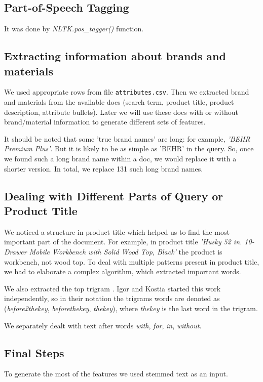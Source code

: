 \documentclass[12pt]{article}
\begin{document}
\subsection{Part-of-Speech Tagging}
It was done by \emph{NLTK.pos\_tagger()} function.

\subsection{Extracting information about brands and materials}
We used appropriate rows from file \texttt{attributes.csv}. Then we extracted brand and materials from the available docs (search term, product title, product description, attribute bullets). Later we will use these docs with or without brand/material information to generate different sets of features.

It should be noted that some 'true brand names' are long: for example, \emph{'BEHR Premium Plus'}. But it is likely to be as simple as 'BEHR' in the query. So, once we found such a long brand name within a doc, we would replace it with a shorter version. In total, we replace 131 such long brand names.

\subsection{Dealing with Different Parts of Query or Product Title}
We noticed a structure in product title which helped us to find the most important part of the document. For example, in product title \emph{'Husky 52 in. 10-Drawer Mobile Workbench with Solid Wood Top, Black'} the product is workbench, not wood top. To deal with multiple patterns present in product title, we had to elaborate a complex algorithm, which extracted important words.

We also extracted the top trigram \cite{crowdflower_3place}. Igor and Kostia started this work independently, so in their notation the trigrams words are denoted as (\emph{before2thekey}, \emph{beforethekey}, \emph{thekey}), where \emph{thekey} is the last word in the trigram.

We separately dealt with text after words \emph{with}, \emph{for}, \emph{in}, \emph{without}.

\subsection{Final Steps}
To generate the most of the features we used stemmed text as an input.
\end{document}
